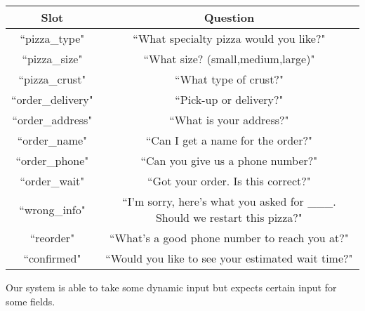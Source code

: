 \documentclass{article}
\begin{document}
\begin{tabular}{|c|c|}
\hline
Slot & Question \\\hline
``pizza\_type" & ``What specialty pizza would you like?"\\\hline
``pizza\_size" & ``What size? (small,medium,large)"\\\hline
``pizza\_crust" & ``What type of crust?"\\\hline
``order\_delivery" & ``Pick-up or delivery?"\\\hline
``order\_address" & ``What is your address?"\\\hline
``order\_name" & ``Can I get a name for the order?"\\\hline
``order\_phone" & ``Can you give us a phone number?"\\\hline
``order\_wait" & ``Got your order. Is this correct?"\\\hline
``wrong\_info" & ``I'm sorry, here's what you asked for \_\_\_. Should we restart this pizza?"\\\hline
``reorder" & ``What's a good phone number to reach you at?"\\\hline
``confirmed" & ``Would you like to see your estimated wait time?"\\\hline
\end{tabular}

\vspace{.5cm}

Our system is able to take some dynamic input but expects certain input for some fields.
\end{document}
